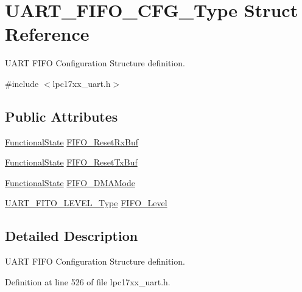\hypertarget{struct_u_a_r_t___f_i_f_o___c_f_g___type}{}\section{U\+A\+R\+T\+\_\+\+F\+I\+F\+O\+\_\+\+C\+F\+G\+\_\+\+Type Struct Reference}
\label{struct_u_a_r_t___f_i_f_o___c_f_g___type}


U\+A\+RT F\+I\+FO Configuration Structure definition.  




{\ttfamily \#include $<$lpc17xx\+\_\+uart.\+h$>$}

\subsection*{Public Attributes}
\begin{DoxyCompactItemize}
\item 
\hyperlink{agilefox_2library_2inc_2stm32f10x__type_8h_ac9a7e9a35d2513ec15c3b537aaa4fba1}{Functional\+State} \hyperlink{struct_u_a_r_t___f_i_f_o___c_f_g___type_a716224e98507c50ac54940ebfc51be6f}{F\+I\+F\+O\+\_\+\+Reset\+Rx\+Buf}
\item 
\hyperlink{agilefox_2library_2inc_2stm32f10x__type_8h_ac9a7e9a35d2513ec15c3b537aaa4fba1}{Functional\+State} \hyperlink{struct_u_a_r_t___f_i_f_o___c_f_g___type_a21d70658d3e3b61667dd3bc27a7817f2}{F\+I\+F\+O\+\_\+\+Reset\+Tx\+Buf}
\item 
\hyperlink{agilefox_2library_2inc_2stm32f10x__type_8h_ac9a7e9a35d2513ec15c3b537aaa4fba1}{Functional\+State} \hyperlink{struct_u_a_r_t___f_i_f_o___c_f_g___type_ac2290ece03c3cf70067e1043cb6dad9e}{F\+I\+F\+O\+\_\+\+D\+M\+A\+Mode}
\item 
\hyperlink{group___u_a_r_t___public___types_gad85d4333c1c346b3078d4abe95d4b2f7}{U\+A\+R\+T\+\_\+\+F\+I\+T\+O\+\_\+\+L\+E\+V\+E\+L\+\_\+\+Type} \hyperlink{struct_u_a_r_t___f_i_f_o___c_f_g___type_afe71db9c3088c092ae6a93ddba4e967d}{F\+I\+F\+O\+\_\+\+Level}
\end{DoxyCompactItemize}


\subsection{Detailed Description}
U\+A\+RT F\+I\+FO Configuration Structure definition. 

Definition at line 526 of file lpc17xx\+\_\+uart.\+h.



